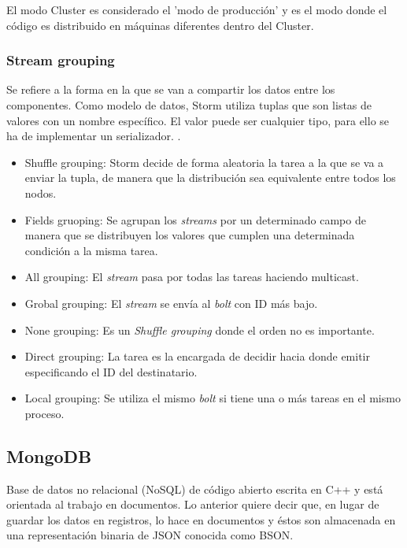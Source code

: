 	El modo Cluster es considerado el 'modo de producción' y es el modo donde el código es distribuido en máquinas diferentes dentro del Cluster.\\

	\subsubsection{Stream grouping}

	Se refiere a la forma en la que se van a compartir los datos entre los componentes. Como modelo de datos, Storm utiliza tuplas que son listas de valores con un nombre específico. El valor puede ser cualquier tipo, para ello se ha de implementar un serializador. \cite{Storm}.\\

	\begin{itemize}
	\item Shuffle grouping: Storm decide de forma aleatoria la tarea a la que se va a enviar la tupla, de manera que la distribución sea equivalente entre todos los nodos.
	\item Fields gruoping: Se agrupan los \textit{streams} por un determinado campo de manera que se distribuyen los valores que cumplen una determinada condición a la misma tarea.
	\item All grouping: El \textit{stream} pasa por todas las tareas haciendo multicast.
	\item Grobal grouping: El \textit{stream} se envía al \textit{bolt} con ID más bajo.
	\item None grouping: Es un \textit{Shuffle grouping} donde el orden no es importante.
	\item Direct grouping: La tarea es la encargada de decidir hacia donde emitir especificando el ID del destinatario.
	\item Local grouping: Se utiliza el mismo \textit{bolt} si tiene una o más tareas en el mismo proceso.
	\end{itemize}

	\subsection{MongoDB}

	Base de datos no relacional (NoSQL) de código abierto escrita en C++ y está orientada al trabajo en documentos. Lo anterior quiere decir que, en lugar de guardar los datos en registros, lo hace en documentos y éstos son almacenada en una representación binaria de JSON conocida como BSON.\\

